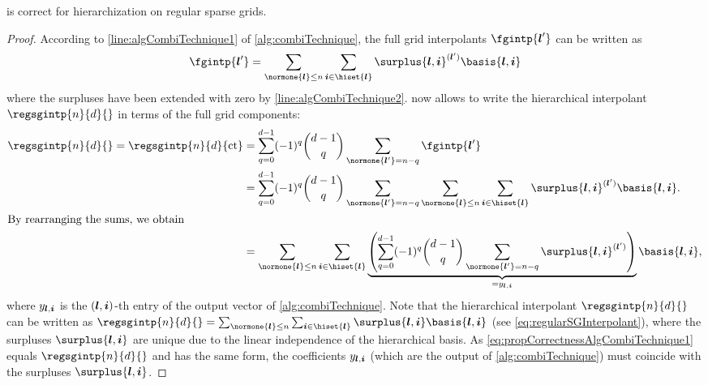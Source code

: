 \begin{proposition}
  \label{prop:correctnessAlgCombiTechnique}
  is correct for hierarchization on regular sparse grids.
\end{proposition}

\begin{proof}
  According to \cref{line:algCombiTechnique1} of \cref{alg:combiTechnique},
  the full grid interpolants $\fgintp{\*l'}$ can be written as
  \begin{equation}
    \fgintp{\*l'}
    = \sum_{\normone{\*l} \le n} \sum_{\*i \in \hiset{\*l}}
    \surplus{\*l,\*i}^{(\*l')} \basis{\*l,\*i}
  \end{equation}
  where the surpluses have been extended with zero by
  \cref{line:algCombiTechnique2}.
   now allows to write the hierarchical
  interpolant $\regsgintp{n}{d}{}$ in terms of the full grid components:
  \begin{subequations}
    \begin{align}
      \regsgintp{n}{d}{}
      = \regsgintp{n}{d}{\ct}
      &= \sum_{q=0}^{d-1} (-1)^q \binom{d-1}{q} \sum_{\normone{\*l'} = n-q}
      \fgintp{\*l'}\\
      &= \sum_{q=0}^{d-1} (-1)^q \binom{d-1}{q} \sum_{\normone{\*l'} = n-q}
      \sum_{\normone{\*l} \le n} \sum_{\*i \in \hiset{\*l}}
      \surplus{\*l,\*i}^{(\*l')} \basis{\*l,\*i}.\\
      \intertext{%
        By rearranging the sums, we obtain%
      }
      \label{eq:propCorrectnessAlgCombiTechnique1}
      &= \sum_{\normone{\*l} \le n} \sum_{\*i \in \hiset{\*l}}
      \underbrace{
        \left(\sum_{q=0}^{d-1} (-1)^q \binom{d-1}{q} \sum_{\normone{\*l'} = n-q}
        \surplus{\*l,\*i}^{(\*l')}\right)
      }_{= \linout{\*l,\*i}}
      \basis{\*l,\*i},
    \end{align}
  \end{subequations}
  where $y_{{\boldsymbol{l}},{\boldsymbol{i}}}$ is the $({\boldsymbol{l}},{\boldsymbol{i}})$-th entry of the output vector
  of \cref{alg:combiTechnique}.
  Note that the hierarchical interpolant $\regsgintp{n}{d}{}$
  can be written as
  $\regsgintp{n}{d}{} = \sum_{\normone{\*l} \le n} \sum_{\*i \in \hiset{\*l}}
  \surplus{\*l,\*i} \basis{\*l,\*i}$
  (see \eqref{eq:regularSGInterpolant}),
  where the surpluses $\surplus{\*l,\*i}$ are unique due to the
  linear independence of the hierarchical basis.
  As \eqref{eq:propCorrectnessAlgCombiTechnique1}
  equals $\regsgintp{n}{d}{}$ and has the same form,
  the coefficients $y_{{\boldsymbol{l}},{\boldsymbol{i}}}$
  (which are the output of \cref{alg:combiTechnique})
  must coincide with the surpluses $\surplus{\*l,\*i}$.
\end{proof}



